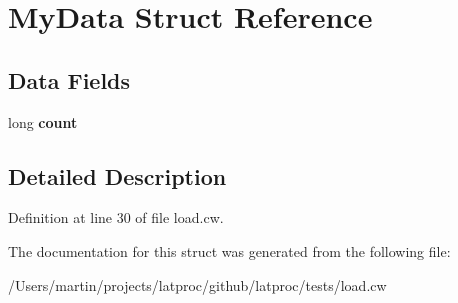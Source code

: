 \hypertarget{struct_my_data}{}\section{My\+Data Struct Reference}
\label{struct_my_data}
\subsection*{Data Fields}
\begin{DoxyCompactItemize}
\item 
\hypertarget{struct_my_data_a66e3fedede6aa372e5196e55e5e8d5c1}{}long {\bfseries count}\label{struct_my_data_a66e3fedede6aa372e5196e55e5e8d5c1}

\end{DoxyCompactItemize}


\subsection{Detailed Description}


Definition at line 30 of file load.\+cw.



The documentation for this struct was generated from the following file\+:\begin{DoxyCompactItemize}
\item 
/\+Users/martin/projects/latproc/github/latproc/tests/load.\+cw\end{DoxyCompactItemize}
